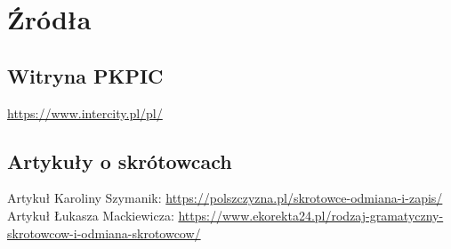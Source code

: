 \documentclass{article}
\begin{document}
\section{Źródła}
    \subsection{Witryna PKPIC}
    \label{PKPIC}
    \url{https://www.intercity.pl/pl/}\newline
    \subsection{Artykuły o skrótowcach}
    \label{skrotowce}
    Artykuł Karoliny Szymanik: \url{https://polszczyzna.pl/skrotowce-odmiana-i-zapis/} \newline
    Artykuł Łukasza Mackiewicza: \url{https://www.ekorekta24.pl/rodzaj-gramatyczny-skrotowcow-i-odmiana-skrotowcow/} \newline
\end{document}
